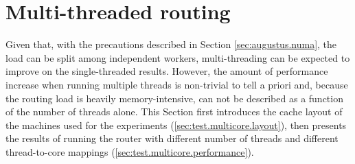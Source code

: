\documentclass[11pt,a4paper,twoside,titlepage,openany]{book}
\begin{document}
\section{Multi-threaded routing}\label{sec:test.multicore}

Given that, with the precautions described in Section \ref{sec:augustus.numa}, the load can be split among independent workers, multi-threading can be expected to improve on the single-threaded results. However, the amount of performance increase when running multiple threads is non-trivial to tell a priori and, because the routing load is heavily memory-intensive, can not be described as a function of the number of threads alone. This Section first introduces the cache layout of the machines used for the experiments (\ref{sec:test.multicore.layout}), then presents the results of running the router with different number of threads and different thread-to-core mappings (\ref{sec:test.multicore.performance}).
\end{document}
